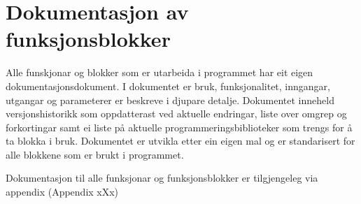 \section{Dokumentasjon av funksjonsblokker}
\thispagestyle{fancy}

Alle funskjonar og blokker som er utarbeida i programmet har eit eigen dokumentasjonsdokument. \newline
I dokumentet er bruk, funksjonalitet, inngangar, utgangar og parameterer er beskreve i djupare detalje.
Dokumentet inneheld versjonshistorikk som oppdatterast ved aktuelle endringar, liste over omgrep og forkortingar samt
ei liste på aktuelle programmeringsbiblioteker som trengs for å ta blokka i bruk.
Dokumentet er utvikla etter ein eigen mal og er standarisert for alle blokkene som er brukt i programmet.

Dokumentasjon til alle funksjonar og funksjonsblokker er tilgjengeleg via appendix (Appendix xXx)
